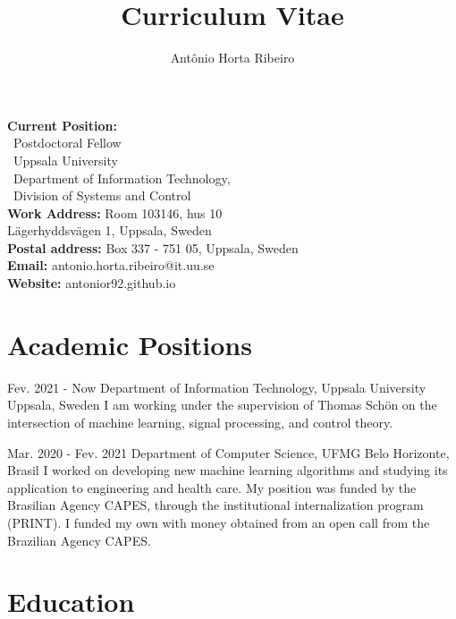 \documentclass[10pt,letterpaper]{article} %
\title{Curriculum Vitae}
\author{Ant\^onio Horta Ribeiro}
\begin{document}
\maketitle

\begin{tcolorbox}[standard jigsaw, opacityback=0]
    \vspace{-4pt}
\begin{multicols}{2}
    \small
    \textbf{Current Position:}\\
    \, Postdoctoral Fellow\\
    \, Uppsala University \\
    \, Department of Information Technology,\\
    \, Division of Systems and Control\\
    {\bf Work Address:} Room 103146, hus 10 \\
    \phantom{\bf Work address:} Lägerhyddsvägen 1, Uppsala, Sweden\\
    {\bf Postal address:} Box 337 - 751 05, Uppsala, Sweden\\
    {\bf Email:} antonio.horta.ribeiro@it.uu.se\\
    {\bf Website:} antonior92.github.io
\end{multicols}
\end{tcolorbox}

\section*{Academic Positions} %


    { Fev. 2021 -   Now  }
    { Department of Information Technology, Uppsala University  }
    { Uppsala, Sweden  }
    { I am working under the supervision of Thomas Schön on the intersection of machine learning, signal processing, and control theory.}

    { Mar. 2020 -   Fev. 2021  }
    { Department of Computer Science, UFMG  }
    { Belo Horizonte, Brasil  }
    { I worked on developing new machine learning algorithms and studying its application to engineering and health care. My position was funded by the Brasilian Agency CAPES, through the institutional internalization program (PRINT). I funded my own with money obtained from an open call from the Brazilian Agency CAPES.}


\section*{Education} %
\end{document}
